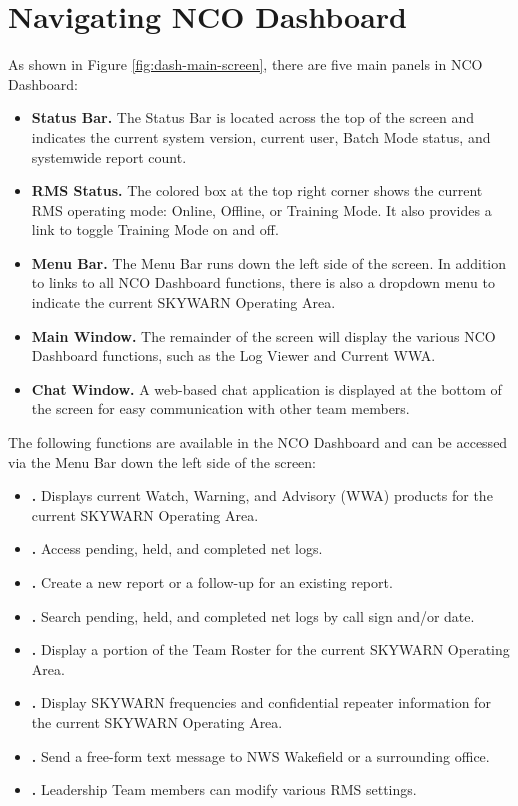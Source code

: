 \documentclass[pdflatex,letterpaper,twoside,12pt]{book}
\begin{document}
\section{Navigating NCO Dashboard}

As shown in Figure \ref{fig:dash-main-screen}, there are five main panels in NCO Dashboard:

\begin{itemize}
\item \textbf{Status Bar.} The Status Bar is located across the top of the screen and indicates the current system version, current user, Batch Mode status, and systemwide report count.
\item \textbf{RMS Status.}  The colored box at the top right corner shows the current RMS operating mode:  Online, Offline, or Training Mode.  It also provides a link to toggle Training Mode on and off.
\item \textbf{Menu Bar.}  The Menu Bar runs down the left side of the screen.  In addition to links to all NCO Dashboard functions, there is also a dropdown menu to indicate the current SKYWARN Operating Area.
\item \textbf{Main Window.}  The remainder of the screen will display the various NCO Dashboard functions, such as the Log Viewer and Current WWA.
\item \textbf{Chat Window.}  A web-based chat application is displayed at the bottom of the screen for easy communication with other team members.
\end{itemize}

The following functions are available in the NCO Dashboard and can be accessed via the Menu Bar down the left side of the screen:

\begin{itemize}
\item \textbf{.}  Displays current Watch, Warning, and Advisory (WWA) products for the current SKYWARN Operating Area.
\item \textbf{.}  Access pending, held, and completed net logs.
\item \textbf{.}  Create a new report or a follow-up for an existing report.
\item \textbf{.}  Search pending, held, and completed net logs by call sign and/or date.
\item \textbf{.}  Display a portion of the Team Roster for the current SKYWARN Operating Area.
\item \textbf{.}  Display SKYWARN frequencies and confidential repeater information for the current SKYWARN Operating Area.
\item \textbf{.}  Send a free-form text message to NWS Wakefield or a surrounding office.
\item \textbf{.}  Leadership Team members can modify various RMS settings.
\end{itemize}
\end{document}
